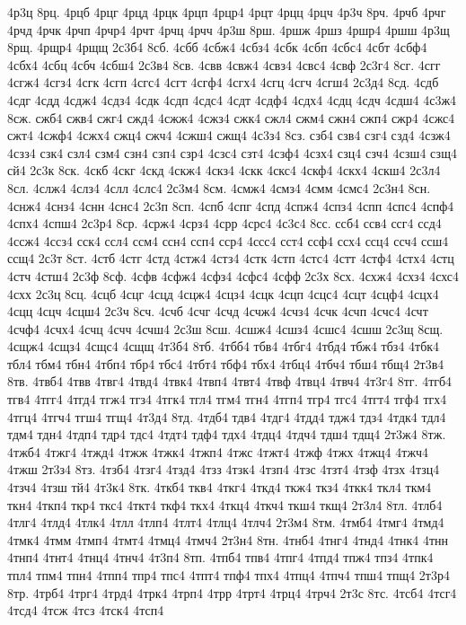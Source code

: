 {4р3ц
8рц.
4рцб
4рцг
4рцд
4рцк
4рцп
4рцр4
4рцт
4рцц
4рцч
4р3ч
8рч.
4рчб
4рчг
4рчд
4рчк
4рчп
4рчр4
4рчт
4рчц
4рчч
4р3ш
8рш.
4ршж
4ршз
4ршр4
4ршш
4р3щ
8рщ.
4рщр4
4рщщ
2с3б4
8сб.
4сбб
4сбж4
4сбз4
4сбк
4сбп
4сбс4
4сбт
4сбф4
4сбх4
4сбц
4сбч
4сбш4
2с3в4
8св.
4свв
4свж4
4свз4
4свс4
4свф
2с3г4
8сг.
4сгг
4сгж4
4сгз4
4сгк
4сгп
4сгс4
4сгт
4сгф4
4сгх4
4сгц
4сгч
4сгш4
2с3д4
8сд.
4сдб
4сдг
4сдд
4сдж4
4сдз4
4сдк
4сдп
4сдс4
4сдт
4сдф4
4сдх4
4сдц
4сдч
4сдш4
4с3ж4
8сж.
сжб4
сжв4
сжг4
сжд4
4сжж4
4сжз4
сжк4
сжл4
сжм4
сжн4
сжп4
сжр4
4сжс4
сжт4
4сжф4
4сжх4
сжц4
сжч4
4сжш4
сжщ4
4с3з4
8сз.
сзб4
сзв4
сзг4
сзд4
4сзж4
4сзз4
сзк4
сзл4
сзм4
сзн4
сзп4
сзр4
4сзс4
сзт4
4сзф4
4сзх4
сзц4
сзч4
4сзш4
сзщ4
сй4
2с3к
8ск.
4скб
4скг
4скд
4скж4
4скз4
4скк
4скс4
4скф4
4скх4
4скш4
2с3л4
8сл.
4слж4
4слз4
4слл
4слс4
2с3м4
8см.
4смж4
4смз4
4смм
4смс4
2с3н4
8сн.
4снж4
4снз4
4снн
4снс4
2с3п
8сп.
4спб
4спг
4спд
4спж4
4спз4
4спп
4спс4
4спф4
4спх4
4спш4
2с3р4
8ср.
4срж4
4срз4
4срр
4срс4
4с3с4
8сс.
ссб4
ссв4
ссг4
ссд4
4ссж4
4ссз4
сск4
ссл4
ссм4
ссн4
ссп4
сср4
4ссс4
сст4
ссф4
ссх4
ссц4
ссч4
ссш4
ссщ4
2с3т
8ст.
4стб
4стг
4стд
4стж4
4стз4
4стк
4стп
4стс4
4стт
4стф4
4стх4
4стц
4стч
4стш4
2с3ф
8сф.
4сфв
4сфж4
4сфз4
4сфс4
4сфф
2с3х
8сх.
4схж4
4схз4
4схс4
4схх
2с3ц
8сц.
4сцб
4сцг
4сцд
4сцж4
4сцз4
4сцк
4сцп
4сцс4
4сцт
4сцф4
4сцх4
4сцц
4сцч
4сцш4
2с3ч
8сч.
4счб
4счг
4счд
4счж4
4счз4
4счк
4счп
4счс4
4счт
4счф4
4счх4
4счц
4счч
4счш4
2с3ш
8сш.
4сшж4
4сшз4
4сшс4
4сшш
2с3щ
8сщ.
4сщж4
4сщз4
4сщс4
4сщщ
4т3б4
8тб.
4тбб4
тбв4
4тбг4
4тбд4
тбж4
тбз4
4тбк4
тбл4
тбм4
тбн4
4тбп4
тбр4
тбс4
4тбт4
тбф4
тбх4
4тбц4
4тбч4
тбш4
тбщ4
2т3в4
8тв.
4твб4
4твв
4твг4
4твд4
4твк4
4твп4
4твт4
4твф
4твц4
4твч4
4т3г4
8тг.
4тгб4
тгв4
4тгг4
4тгд4
тгж4
тгз4
4тгк4
тгл4
тгм4
тгн4
4тгп4
тгр4
тгс4
4тгт4
тгф4
тгх4
4тгц4
4тгч4
тгш4
тгщ4
4т3д4
8тд.
4тдб4
тдв4
4тдг4
4тдд4
тдж4
тдз4
4тдк4
тдл4
тдм4
тдн4
4тдп4
тдр4
тдс4
4тдт4
тдф4
тдх4
4тдц4
4тдч4
тдш4
тдщ4
2т3ж4
8тж.
4тжб4
4тжг4
4тжд4
4тжж
4тжк4
4тжп4
4тжс
4тжт4
4тжф
4тжх
4тжц4
4тжч4
4тжш
2т3з4
8тз.
4тзб4
4тзг4
4тзд4
4тзз
4тзк4
4тзп4
4тзс
4тзт4
4тзф
4тзх
4тзц4
4тзч4
4тзш
тй4
4т3к4
8тк.
4ткб4
ткв4
4ткг4
4ткд4
ткж4
ткз4
4ткк4
ткл4
ткм4
ткн4
4ткп4
ткр4
ткс4
4ткт4
ткф4
ткх4
4ткц4
4ткч4
ткш4
ткщ4
2т3л4
8тл.
4тлб4
4тлг4
4тлд4
4тлк4
4тлл
4тлп4
4тлт4
4тлц4
4тлч4
2т3м4
8тм.
4тмб4
4тмг4
4тмд4
4тмк4
4тмм
4тмп4
4тмт4
4тмц4
4тмч4
2т3н4
8тн.
4тнб4
4тнг4
4тнд4
4тнк4
4тнн
4тнп4
4тнт4
4тнц4
4тнч4
4т3п4
8тп.
4тпб4
тпв4
4тпг4
4тпд4
тпж4
тпз4
4тпк4
тпл4
тпм4
тпн4
4тпп4
тпр4
тпс4
4тпт4
тпф4
тпх4
4тпц4
4тпч4
тпш4
тпщ4
2т3р4
8тр.
4трб4
4трг4
4трд4
4трк4
4трп4
4трр
4трт4
4трц4
4трч4
2т3с
8тс.
4тсб4
4тсг4
4тсд4
4тсж
4тсз
4тск4
4тсп4
}
